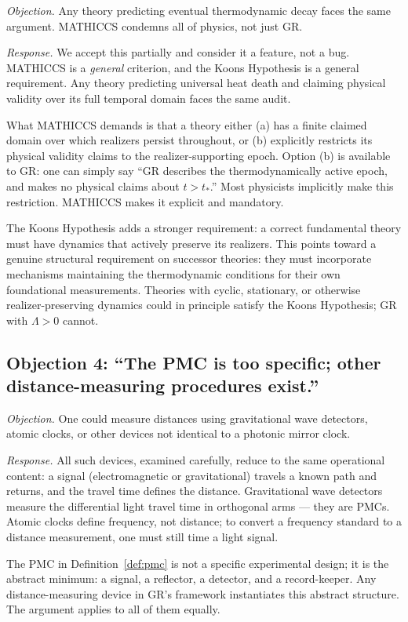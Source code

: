 \documentclass[11pt,a4paper]{article}
\begin{document}
\emph{Objection.} Any theory predicting eventual thermodynamic decay faces the same
argument. MATHICCS condemns all of physics, not just GR.

\emph{Response.} We accept this partially and consider it a feature, not a bug.
MATHICCS is a \emph{general} criterion, and the Koons Hypothesis is a general
requirement. Any theory predicting universal heat death and claiming physical validity
over its full temporal domain faces the same audit.

What MATHICCS demands is that a theory either (a) has a finite claimed domain over
which realizers persist throughout, or (b) explicitly restricts its physical validity
claims to the realizer-supporting epoch. Option (b) is available to GR: one can simply
say ``GR describes the thermodynamically active epoch, and makes no physical claims
about $t > t_*$.'' Most physicists implicitly make this restriction. MATHICCS makes it
explicit and mandatory.

The Koons Hypothesis adds a stronger requirement: a correct fundamental theory must
have dynamics that actively preserve its realizers. This points toward a genuine
structural requirement on successor theories: they must incorporate mechanisms
maintaining the thermodynamic conditions for their own foundational measurements.
Theories with cyclic, stationary, or otherwise realizer-preserving dynamics could in
principle satisfy the Koons Hypothesis; GR with $\Lambda > 0$ cannot.

\subsection{Objection 4: ``The PMC is too specific; other distance-measuring procedures exist.''}

\emph{Objection.} One could measure distances using gravitational wave detectors,
atomic clocks, or other devices not identical to a photonic mirror clock.

\emph{Response.} All such devices, examined carefully, reduce to the same operational
content: a signal (electromagnetic or gravitational) travels a known path and returns,
and the travel time defines the distance. Gravitational wave detectors measure the
differential light travel time in orthogonal arms --- they are PMCs. Atomic clocks
define frequency, not distance; to convert a frequency standard to a distance
measurement, one must still time a light signal.

The PMC in Definition~\ref{def:pmc} is not a specific experimental design; it is the
abstract minimum: a signal, a reflector, a detector, and a record-keeper. Any
distance-measuring device in GR's framework instantiates this abstract structure. The
argument applies to all of them equally.
\end{document}
